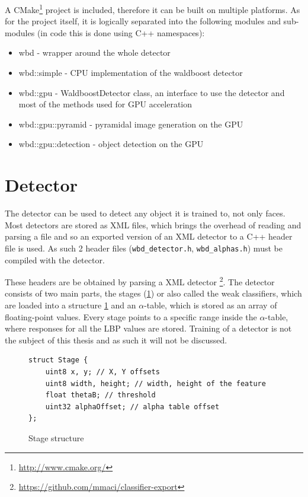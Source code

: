 A CMake\footnote{\url{http://www.cmake.org/}} project is included, therefore it can be built on multiple platforms. As for the project itself, it is logically separated into the following modules and sub-modules (in code this is done using C++ namespaces):

\begin{itemize}
	\item wbd - wrapper around the whole detector
	\item wbd::simple - CPU implementation of the waldboost detector
	\item wbd::gpu - WaldboostDetector class, an interface to use the detector and most of the methods used for GPU acceleration
	\item wbd::gpu::pyramid - pyramidal image generation on the GPU
	\item wbd::gpu::detection - object detection on the GPU
\end{itemize}

\section{Detector}\label{sec:detector}

The detector can be used to detect any object it is trained to, not only faces. Most detectors are stored as XML files, which brings the overhead of reading and parsing a file and so an exported version of an XML detector to a C++ header file is used. As such 2 header files (\verb|wbd_detector.h|, \verb|wbd_alphas.h|) must be compiled with the detector.

These headers are be obtained by parsing a XML detector \footnote{\url{https://github.com/mmaci/classifier-export}}. The detector consists of two main parts, the stages (\ref{fig:stage}) or also called the weak classifiers, which are loaded into a structure \ref{fig:stage} and an $\alpha$-table, which is stored as an array of floating-point values. Every stage points to a specific range inside the $\alpha$-table, where responses for all the LBP values are stored. Training of a detector is not the subject of this thesis and as such it will not be discussed.

\begin{figure}[h!]
\begin{verbatim}
struct Stage {
    uint8 x, y; // X, Y offsets
    uint8 width, height; // width, height of the feature
    float thetaB; // threshold
    uint32 alphaOffset; // alpha table offset
};
\end{verbatim}
\caption{Stage structure}
\label{fig:stage}
\end{figure}

